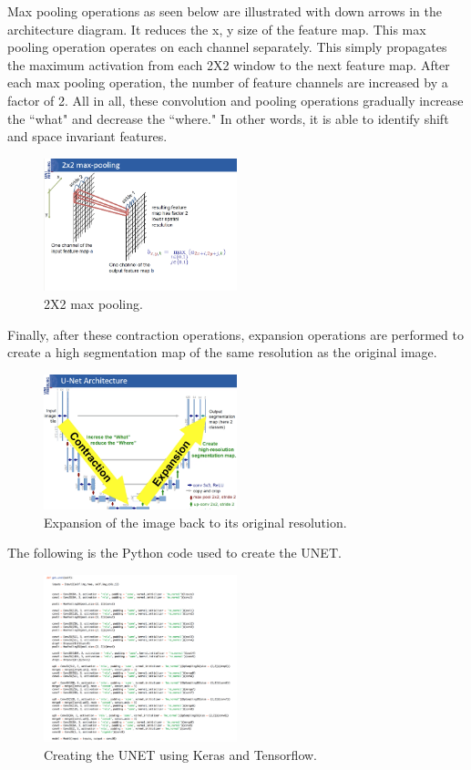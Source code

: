 \documentclass[letterpaper]{article}
\begin{document}
Max pooling operations as seen below are illustrated with down arrows in the architecture diagram. It reduces the x, y size of the feature map. This max pooling operation operates on each channel separately.  This simply propagates the maximum activation from each 2X2 window to the next feature map. After each max pooling operation, the number of feature channels are increased by a factor of 2. All in all, these convolution and pooling operations gradually increase the ``what" and decrease the ``where." In other words, it is able to identify shift and space invariant features. 


 \begin{figure}[H]
  \centerline{\includegraphics[width=0.5\textwidth]{Images/UNET2.png}}
  \caption{2X2 max pooling.}
  \label{fig:unet2}
\end{figure}

Finally, after these contraction operations, expansion operations are performed to create a high segmentation map of the same resolution as the original image.  	

 \begin{figure}[H]
  \centerline{\includegraphics[width=0.5\textwidth]{Images/UNET3.png}}
  \caption{Expansion of the image back to its original resolution.}
  \label{fig:unet3}
\end{figure}


The following is the Python code used to create the UNET. 

 \begin{figure}[H]
  \centerline{\includegraphics[width=0.5\textwidth]{Images/KerasUNET.png}}
  \caption{Creating the UNET using Keras and Tensorflow.}
  \label{fig:kerasunet3}
\end{figure}
\end{document}

